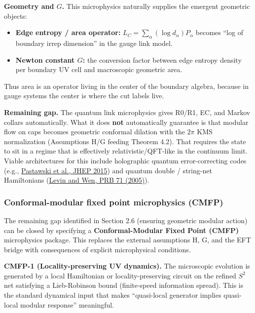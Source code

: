 \documentclass[11pt,a4paper]{article}
\theoremstyle{remark}
\providecommand{\tightlist}{%
  \setlength{\itemsep}{0pt}\setlength{\parskip}{0pt}}
\begin{document}
\textbf{Geometry and \(G\).} This microphysics naturally supplies the emergent
geometric objects:

\begin{itemize}
\tightlist
\item
  \textbf{Edge entropy / area operator:} \(L_C = \sum_\alpha (\log d_\alpha) P_\alpha\)
  becomes ``log of boundary irrep dimension'' in the gauge link model.
\item
  \textbf{Newton constant \(G\):} the conversion factor between edge entropy density
  per boundary UV cell and macroscopic geometric area.
\end{itemize}

Thus area is an operator living in the center of the boundary algebra, because
in gauge systems the center is where the cut labels live.

\textbf{Remaining gap.} The quantum link microphysics gives R0/R1, EC, and Markov
collars automatically. What it does \textbf{not} automatically guarantee is that
modular flow on caps becomes geometric conformal dilation with the \(2\pi\) KMS
normalization (Assumptions H/G feeding Theorem 4.2). That requires the state to
sit in a regime that is effectively relativistic/QFT-like in the continuum
limit. Viable architectures for this include holographic quantum error-correcting
codes (e.g., \href{https://arxiv.org/abs/1503.06237}{Pastawski et al., JHEP 2015})
and quantum double / string-net Hamiltonians
(\href{https://link.aps.org/doi/10.1103/PhysRevB.71.045110}{Levin and Wen, PRB 71 (2005)}).

\subsubsection{Conformal-modular fixed point microphysics (CMFP)}\label{conformal-modular-fixed-point-microphysics-cmfp}

The remaining gap identified in Section 2.6 (ensuring geometric modular action) can
be closed by specifying a \textbf{Conformal-Modular Fixed Point (CMFP)} microphysics
package. This replaces the external assumptions H, G, and the EFT bridge with
consequences of explicit microphysical conditions.

\textbf{CMFP-1 (Locality-preserving UV dynamics).} The microscopic evolution is
generated by a local Hamiltonian or locality-preserving circuit on the refined
\(S^2\) net satisfying a Lieb-Robinson bound (finite-speed information spread).
This is the standard dynamical input that makes ``quasi-local generator implies
quasi-local modular response'' meaningful.
\end{document}
